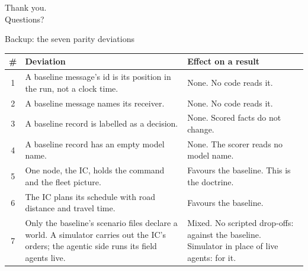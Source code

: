 \documentclass[10pt,aspectratio=169]{beamer}
\begin{document}
\begin{frame}[standout]
  Thank you.\\[6pt]
  Questions?
\end{frame}

\appendix

\begin{frame}{Backup: the seven parity deviations}
  \scriptsize
  \begin{tabularx}{\textwidth}{c>{\raggedright\arraybackslash}X>{\raggedright\arraybackslash}p{4.6cm}}
    \toprule
    \# & Deviation & Effect on a result \\
    \midrule
    1 & A baseline message's id is its position in the run, not a clock time. & None. No code reads it. \\
    2 & A baseline message names its receiver. & None. No code reads it. \\
    3 & A baseline record is labelled as a decision. & None. Scored facts do not change. \\
    4 & A baseline record has an empty model name. & None. The scorer reads no model name. \\
    5 & One node, the IC, holds the command and the fleet picture. & Favours the baseline. This is the doctrine. \\
    6 & The IC plans its schedule with road distance and travel time. & Favours the baseline. \\
    7 & Only the baseline's scenario files declare a world. A simulator carries out the IC's orders; the agentic side runs its field agents live. & Mixed. No scripted drop-offs: against the baseline. Simulator in place of live agents: for it. \\
    \bottomrule
  \end{tabularx}
\end{frame}
\end{document}
